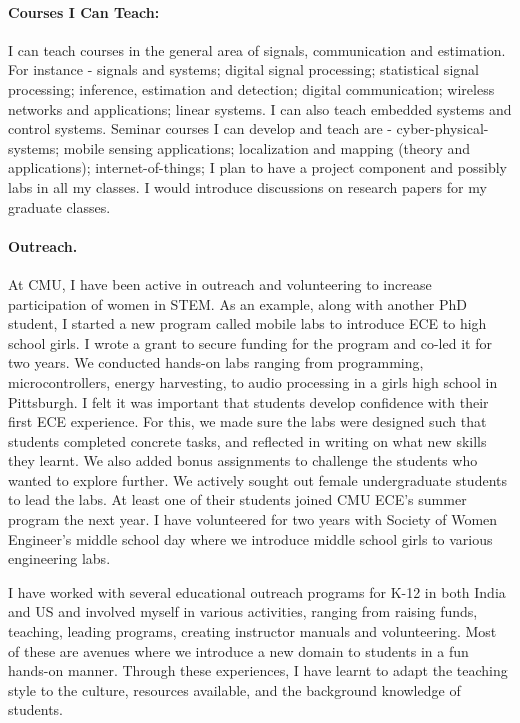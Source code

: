 \documentclass[10pt]{article}
\begin{document}
\paragraph{Courses I Can Teach:}
I can teach courses in the general area of signals, communication and estimation. For instance - signals and systems;  digital signal processing; statistical signal processing; inference, estimation and detection; digital communication; wireless networks and applications; linear systems. I can also teach embedded systems and control systems. 
Seminar courses I can develop and teach are - cyber-physical-systems; mobile sensing applications; localization and mapping (theory and applications); internet-of-things; 
I plan to have a project component and possibly labs in all my classes. I would introduce discussions on research papers for my graduate classes.



 \paragraph{Outreach.} 
 At CMU, I have been active in outreach and volunteering to increase participation of women in STEM. %
As an example, along with another PhD student, I started a new program called mobile labs to introduce ECE to high school girls. I wrote a grant to secure funding for the program and co-led it for two years. We conducted hands-on labs ranging from programming, microcontrollers, energy harvesting, to audio processing in a girls high school in Pittsburgh. I felt it was important that students develop confidence with their first ECE experience. For this, we made sure the labs were designed such that students completed concrete tasks, and reflected in writing on what new skills they learnt. We also added bonus assignments to challenge the students who wanted to explore further. We actively sought out female undergraduate students to lead the labs. At least one of their students joined CMU ECE's summer program the next year. I have volunteered for two years with Society of Women Engineer's middle school day where we introduce middle school girls to various engineering labs.

I have worked with several educational outreach programs for K-12 in both India and US and involved myself in various activities, ranging from raising funds, teaching, leading programs, creating instructor manuals and volunteering. Most of these are avenues where we introduce a new domain to students in a fun hands-on manner. Through these experiences, I have learnt to adapt the teaching style to the culture, resources available, and the background knowledge of students. \\
\end{document}

